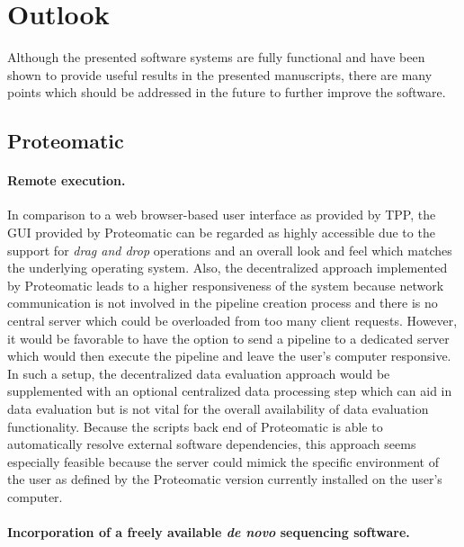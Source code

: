 \section{Outlook}

Although the presented software systems are fully functional and have been
shown to provide useful results in the presented manuscripts, there are many
points which should be addressed in the future to further improve the software.

\subsection{Proteomatic}

\paragraph{Remote execution.}

In comparison to a web browser-based user interface as provided by TPP, the 
GUI provided by Proteomatic can be regarded as highly accessible due to 
the support for {\em drag and drop} operations and an overall look and feel
which matches the underlying operating system.
Also, the decentralized approach implemented by Proteomatic leads to a
higher responsiveness of the system because network communication is not 
involved in the pipeline creation process and there is no central server which
could be overloaded from too many client requests.
However, it would be favorable to have the option to send a pipeline to a 
dedicated server which would then execute the pipeline and leave the 
user's computer responsive.
In such a setup, the decentralized data evaluation approach would be 
supplemented with an optional centralized data processing step which can
aid in data evaluation but is not vital for the overall availability of
data evaluation functionality.
Because the scripts back end of Proteomatic is able to automatically resolve 
external software dependencies, this approach seems especially feasible because
the server could mimick the specific environment of the user as defined by
the Proteomatic version currently installed on the user's computer.

\paragraph{Incorporation of a freely available {\em de novo} sequencing software.}

